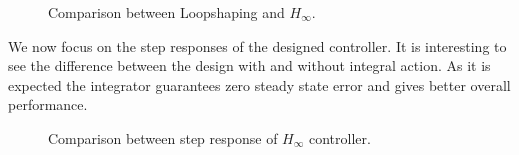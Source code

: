   \begin{figure}[h]
  \centering
  \hfill
\caption{Comparison between Loopshaping and $H_{\infty}$.}
\end{figure}

We now focus on the step responses of the designed controller. It is interesting to see the difference between the design with and without integral action. As it is expected the integrator guarantees zero steady state error and gives better overall performance.

\begin{figure}[h]
	\centering
	\hfill
	\caption{Comparison between step response of $H_\infty$ controller.}
\end{figure}